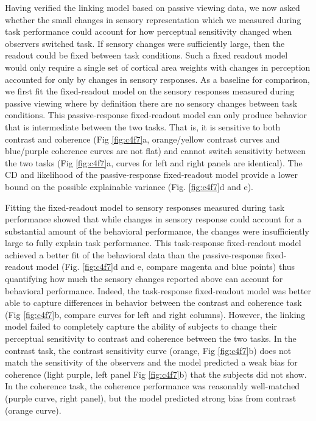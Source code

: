 \documentclass{report}
\begin{document}
Having verified the linking model based on passive viewing data, we now asked whether the small changes in sensory representation which we measured during task performance could account for how perceptual sensitivity changed when observers switched task. If sensory changes were sufficiently large, then the readout could be fixed between task conditions. Such a fixed readout model would only require a single set of cortical area weights with changes in perception accounted for only by changes in sensory responses. 
As a baseline for comparison, we first fit the fixed-readout model on the sensory responses measured during passive viewing where by definition there are no sensory changes between task conditions. This passive-response fixed-readout model can only produce behavior that is intermediate between the two tasks. That is, it is sensitive to both contrast and coherence (Fig \ref{fig:c4f7}a, orange/yellow contrast curves and blue/purple coherence curves are not flat) and cannot switch sensitivity between the two tasks (Fig \ref{fig:c4f7}a, curves for left and right panels are identical).  The CD and likelihood of the passive-response fixed-readout model provide a lower bound on the possible explainable variance (Fig. \ref{fig:c4f7}d and e). 

Fitting the fixed-readout model to sensory responses measured during task performance showed that while changes in sensory response could account for a substantial amount of the behavioral performance, the changes were insufficiently large to fully explain task performance. This task-response fixed-readout model achieved a better fit of the behavioral data than the passive-response fixed-readout model (Fig. \ref{fig:c4f7}d and e, compare magenta and blue points) thus quantifying how much the sensory changes reported above can account for behavioral performance. Indeed, the task-response fixed-readout model was better able to capture differences in behavior between the contrast and coherence task (Fig \ref{fig:c4f7}b, compare curves for left and right columns). However, the linking model failed to completely capture the ability of subjects to change their perceptual sensitivity to contrast and coherence between the two tasks. In the contrast task, the contrast sensitivity curve (orange, Fig \ref{fig:c4f7}b) does not match the sensitivity of the observers and the model predicted a weak bias for coherence (light purple, left panel Fig \ref{fig:c4f7}b) that the subjects did not show. In the coherence task, the coherence performance was reasonably well-matched (purple curve, right panel), but the model predicted strong bias from contrast (orange curve).
\end{document}
